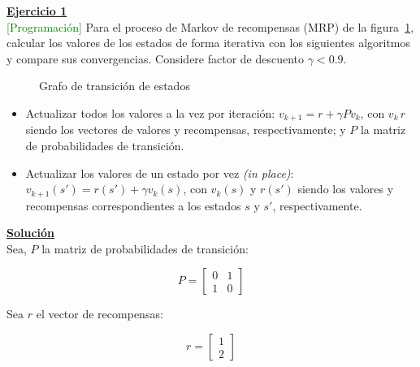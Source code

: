 \indent\underline{\textbf{Ejercicio 1}}\\
\textcolor{green}{[Programación]} Para el proceso de Markov de recompensas (MRP) de la figura~\ref{fig:grafo_ej_1}, calcular los valores de los estados de forma iterativa con los siguientes algoritmos y compare sus convergencias.
Considere factor de descuento $\gamma < 0.9$.\\

\begin{figure}[H]
    \centering
    \caption{Grafo de transición de estados}\label{fig:grafo_ej_1}
\end{figure}


\begin{itemize}
    \item Actualizar todos los valores a la vez por iteración: $v_{k+1} = r + \gamma P v_k$, con $v_k\, r$ siendo los vectores de valores y recompensas, respectivamente; y $P$ la matriz de probabilidades de transición.
    \item Actualizar los valores de un estado por vez \textit{(in place)}: $v_{k+1}(s') = r(s') + \gamma v_k(s)$, con $v_k(s)$ y $r(s')$ siendo los valores y recompensas correspondientes a los estados $s$ y $s'$, respectivamente.
\end{itemize}

\indent\underline{\textbf{Solución}}\\

Sea, $P$ la matriz de probabilidades de transición:

\[
  P = \begin{bmatrix} 0 & 1 \\ 1 & 0 \end{bmatrix}
\]

Sea $r$ el vector de recompensas:

\[
  r = \begin{bmatrix} 1 \\ 2 \end{bmatrix}
\]


